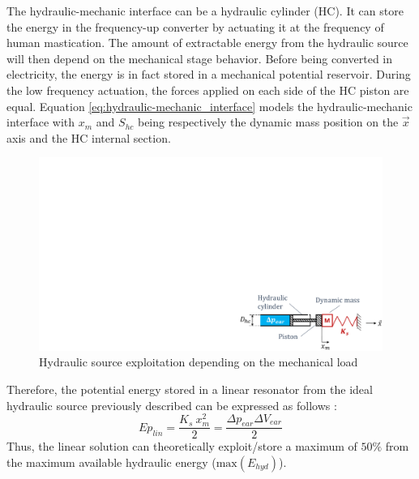 \documentclass[3p,twocolumn,preprint]{elsarticle}
\begin{document}
The hydraulic-mechanic interface can be a hydraulic cylinder (HC). It can store the energy in the frequency-up converter by actuating it at the frequency of human mastication. The amount of extractable energy from the hydraulic source will then depend on the mechanical stage behavior. Before being converted in electricity, the energy is in fact stored in a mechanical potential reservoir. During the low frequency actuation, the forces applied on each side of the HC piston are equal. Equation \ref{eq:hydraulic-mechanic_interface} models the hydraulic-mechanic interface with $x_{m}$ and $ S_{hc}$ being respectively the dynamic mass position on the $\vec{x}$ axis and the HC internal section.
\begin{figure}[!htbp]
	\centering
	\captionsetup{justification=centering}
	\includegraphics[trim={19.7cm 0cm 0cm 13cm},clip, width=0.7\linewidth]{figures/hydraulic_mechanic_interface.pdf}
	\caption{Hydraulic source exploitation depending on the mechanical load}
	\label{fig:hydraulic_mechanic_interface}
\end{figure}
Therefore, the potential energy stored in a linear resonator from the ideal hydraulic source previously described can be expressed as follows :
\begin{equation}
	Ep_{lin} = \dfrac{K_s\ x_{m}^2}{2} = \dfrac{\Delta p_{ear} \Delta V_{ear}}{2}
	\label{eq:best_linear_soution}
\end{equation}
Thus, the linear solution can theoretically exploit/store a maximum of $50\%$ from the maximum available hydraulic energy ($\text{max}(E_{hyd})$). 
\end{document}
